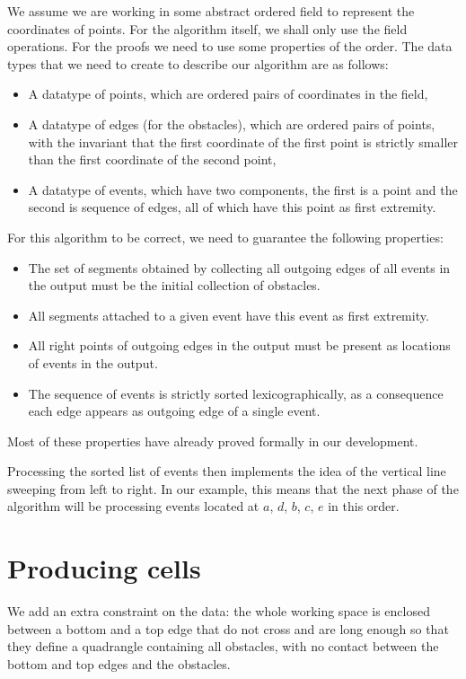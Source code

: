 \documentclass{easychair}
\begin{document}
We assume we are working in some abstract ordered field to represent the
coordinates of points.  For the algorithm itself, we shall only use the field
operations.  For the proofs we need to use some properties of the order.
The data types that we need to create to describe our algorithm are as
follows:
\begin{itemize}
\item A datatype of points, which are ordered pairs of coordinates in the field,
\item A datatype of edges (for the obstacles), which are ordered pairs of
  points, with the invariant that the first coordinate of the first
  point is strictly smaller than the first coordinate of the second point,
\item A datatype of events, which have two components, the first is a
  point and the second is sequence of edges, all of which have this
  point as first extremity.
\end{itemize}
For this algorithm to be correct, we need to guarantee the following
properties:
\begin{itemize}
\item The set of segments obtained by collecting all outgoing edges of
  all events in the output must be the initial collection of obstacles.
\item All segments attached to a given event have this event as first
  extremity.
\item All right points of outgoing edges in the output must be present
  as locations of events in the output.
\item The sequence of events is strictly sorted lexicographically, as
  a consequence each edge appears as outgoing edge of a single event.
\end{itemize}
Most of these properties have already proved formally in our
development.

Processing the sorted list of events then implements the idea of the
vertical line sweeping from left to right.  In our example, this means
that the next phase of the algorithm will be processing events located at
\(a\), \(d\), \(b\), \(c\), \(e\) in this order.

\section{Producing cells}
We add an extra constraint on the data: the whole working space is
enclosed between a bottom and a top edge that do not cross and are
long enough so that they define a quadrangle containing all obstacles,
with no contact between the bottom and top edges and the obstacles.
\end{document}
